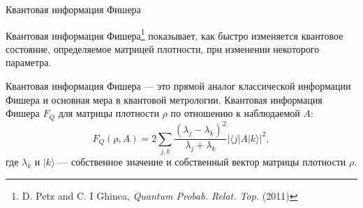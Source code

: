 \begin{frame}{Квантовая информация Фишера}
  \begin{block}{}
    Квантовая информация Фишера\footnote[frame]{D. Petz and C. I Ghinea, \textit{Quantum Probab. Relat. Top.} (2011)}
    показывает,
    как быстро изменяется квантовое состояние,
    определяемое матрицей плотности,
    при изменении некоторого параметра.
  \end{block}
  Квантовая информация Фишера --- это прямой аналог классической информации Фишера и основная мера в квантовой метрологии.
  Квантовая информация Фишера $F_Q$ для матрицы плотности $\rho$ по отношению к наблюдаемой $A$:
  $$
    F_Q \left(\rho, A \right) =
      2\sum_{j,k} \frac{\left(\lambda_j - \lambda_k \right)^2}
        {\lambda_j + \lambda_k}
      \left| \langle j|A|k \rangle \right|^2,
  $$
  где $\lambda_k$ и $|k \rangle$ --- собственное значение и собственный вектор матрицы плотности $\rho$.
\end{frame}
